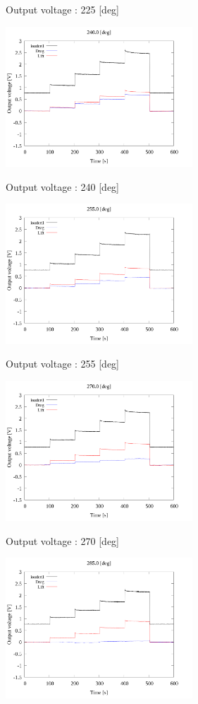 \begin{multicols}{2}
\begin{figure_here}
\begin{center}
            \caption{Output voltage : 225 [deg]}
            \includegraphics[width=70mm]{../../02_workspace/result/2-1/plot/01-3_allsensors/01_allsensors_2400.png}
            \caption{Output voltage : 240 [deg]}
            \includegraphics[width=70mm]{../../02_workspace/result/2-1/plot/01-3_allsensors/01_allsensors_2550.png}
            \caption{Output voltage : 255 [deg]}
            \includegraphics[width=70mm]{../../02_workspace/result/2-1/plot/01-3_allsensors/01_allsensors_2700.png}
            \caption{Output voltage : 270 [deg]}
            \includegraphics[width=70mm]{../../02_workspace/result/2-1/plot/01-3_allsensors/01_allsensors_2850.png}

\end{center}
\end{figure_here}
\end{multicols}
